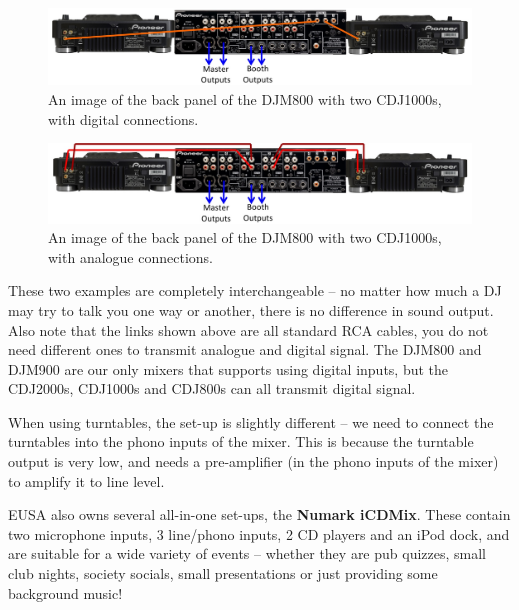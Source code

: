 \documentclass[14pt,twocolumn]{extarticle} %
\begin{document}
\begin{figure}[h]
\begin{center}

\includegraphics[width=18cm]{dj-setup.jpg}
\caption{An image of the back panel of the DJM800 with two CDJ1000s, with digital connections.}
\label{fig:dj-setup}

\end{center}
\end{figure}

\begin{figure}[h]
\begin{center}

\includegraphics[width=18cm]{dj-setup2.jpg}
\caption{An image of the back panel of the DJM800 with two CDJ1000s, with analogue connections.}
\label{fig:dj-setup2}

\end{center}
\end{figure}

These two examples are completely interchangeable – no matter how much a DJ may try to talk you one way or another, there is no difference in sound output. Also note that the links shown above are all standard RCA cables, you do not need different ones to transmit analogue and digital signal. The DJM800 and DJM900 are our only mixers that supports using digital inputs, but the CDJ2000s, CDJ1000s and CDJ800s can all transmit digital signal.

When using turntables, the set-up is slightly different – we need to connect the turntables into the phono inputs of the mixer. This is because the turntable output is very low, and needs a pre-amplifier (in the phono inputs of the mixer) to amplify it to line level.

EUSA also owns several all-in-one set-ups, the \textbf{Numark iCDMix}. These contain two microphone inputs, 3 line/phono inputs, 2 CD players and an iPod dock, and are suitable for a wide variety of events – whether they are pub quizzes, small club nights, society socials, small presentations or just providing some background music!
\end{document}
